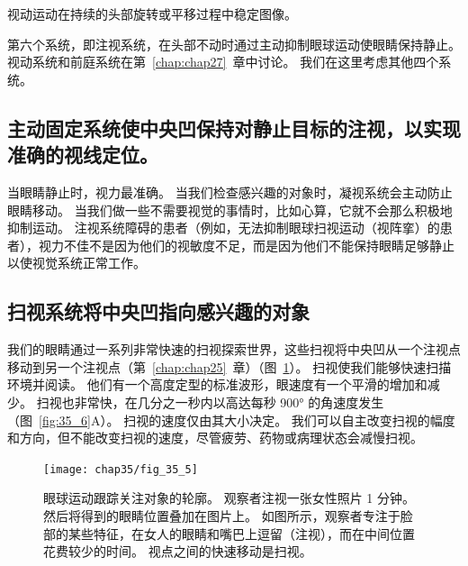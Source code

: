 视动运动在持续的头部旋转或平移过程中稳定图像。


第六个系统，即注视系统，在头部不动时通过主动抑制眼球运动使眼睛保持静止。
视动系统和前庭系统在第~\ref{chap:chap27}~章中讨论。
我们在这里考虑其他四个系统。



\subsection{主动固定系统使中央凹保持对静止目标的注视，以实现准确的视线定位。}

当眼睛静止时，视力最准确。
当我们检查感兴趣的对象时，凝视系统会主动防止眼睛移动。
当我们做一些不需要视觉的事情时，比如心算，它就不会那么积极地抑制运动。
注视系统障碍的患者（例如，无法抑制眼球扫视运动（视阵挛）的患者），视力不佳不是因为他们的视敏度不足，而是因为他们不能保持眼睛足够静止以使视觉系统正常工作。



\subsection{扫视系统将中央凹指向感兴趣的对象}

我们的眼睛通过一系列非常快速的扫视探索世界，这些扫视将中央凹从一个注视点移动到另一个注视点（第~\ref{chap:chap25}~章）（图~\ref{fig:35_5}）。
扫视使我们能够快速扫描环境并阅读。 
他们有一个高度定型的标准波形，眼速度有一个平滑的增加和减少。
扫视也非常快，在几分之一秒内以高达每秒 900° 的角速度发生（图~\ref{fig:35_6}A）。
扫视的速度仅由其大小决定。
我们可以自主改变扫视的幅度和方向，但不能改变扫视的速度，尽管疲劳、药物或病理状态会减慢扫视。


\begin{figure}[htbp]
	\centering
	\texttt{[image: chap35/fig\_35\_5]}
	\caption{眼球运动跟踪关注对象的轮廓。
		观察者注视一张女性照片 1 分钟。
		然后将得到的眼睛位置叠加在图片上。
		如图所示，观察者专注于脸部的某些特征，在女人的眼睛和嘴巴上逗留（注视），而在中间位置花费较少的时间。 
		视点之间的快速移动是扫视\cite{yarbus2013eye}。}
	\label{fig:35_5}
\end{figure}


